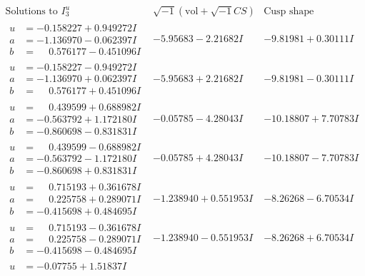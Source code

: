 \documentclass[1p]{elsarticle_modified}
\theoremstyle{definition}
\newcommand{\I}{\sqrt{-1}}
\begin{document}
$$\begin{array}{c|c|c}  
\text{Solutions to }I^u_{3}& \I (\text{vol} + \sqrt{-1}CS) & \text{Cusp shape}\\
 \hline 
\begin{aligned}
u &= -0.158227 + 0.949272 I \\
a &= -1.136970 - 0.062397 I \\
b &= \phantom{-}0.576177 - 0.451096 I\end{aligned}
 & -5.95683 - 2.21682 I & -9.81981 + 0.30111 I \\ \hline\begin{aligned}
u &= -0.158227 - 0.949272 I \\
a &= -1.136970 + 0.062397 I \\
b &= \phantom{-}0.576177 + 0.451096 I\end{aligned}
 & -5.95683 + 2.21682 I & -9.81981 - 0.30111 I \\ \hline\begin{aligned}
u &= \phantom{-}0.439599 + 0.688982 I \\
a &= -0.563792 + 1.172180 I \\
b &= -0.860698 - 0.831831 I\end{aligned}
 & -0.05785 - 4.28043 I & -10.18807 + 7.70783 I \\ \hline\begin{aligned}
u &= \phantom{-}0.439599 - 0.688982 I \\
a &= -0.563792 - 1.172180 I \\
b &= -0.860698 + 0.831831 I\end{aligned}
 & -0.05785 + 4.28043 I & -10.18807 - 7.70783 I \\ \hline\begin{aligned}
u &= \phantom{-}0.715193 + 0.361678 I \\
a &= \phantom{-}0.225758 + 0.289071 I \\
b &= -0.415698 + 0.484695 I\end{aligned}
 & -1.238940 + 0.551953 I & -8.26268 - 6.70534 I \\ \hline\begin{aligned}
u &= \phantom{-}0.715193 - 0.361678 I \\
a &= \phantom{-}0.225758 - 0.289071 I \\
b &= -0.415698 - 0.484695 I\end{aligned}
 & -1.238940 - 0.551953 I & -8.26268 + 6.70534 I \\ \hline\begin{aligned}
u &= -0.07755 + 1.51837 I \\

\end{aligned}
\end{array}$$
\end{document}
